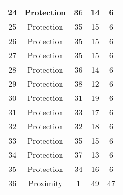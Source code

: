 \documentclass[results.tex]{subfiles}
\begin{document}
\begin{center}
\begin{tabular}{| c || c | c | c | c |}
            \hline
            24                      & Protection                   & 36                     & 14                      & 6                    \\
            \hline
            25                      & Protection                   & 35                     & 15                      & 6                    \\
            \hline
            26                      & Protection                   & 35                     & 15                      & 6                    \\
            \hline
            27                      & Protection                   & 35                     & 15                      & 6                    \\
            \hline
            28                      & Protection                   & 36                     & 14                      & 6                    \\
            \hline
            29                      & Protection                   & 38                     & 12                      & 6                    \\
            \hline
            30                      & Protection                   & 31                     & 19                      & 6                    \\
            \hline
            31                      & Protection                   & 33                     & 17                      & 6                    \\
            \hline
            32                      & Protection                   & 32                     & 18                      & 6                    \\
            \hline
            33                      & Protection                   & 35                     & 15                      & 6                    \\
            \hline
            34                      & Protection                   & 37                     & 13                      & 6                    \\
            \hline
            35                      & Protection                   & 34                     & 16                      & 6                    \\
            \hline
            36                      & Proximity                    & 1                      & 49                      & 47                   \\

\end{tabular}
\end{center}
\end{document}
